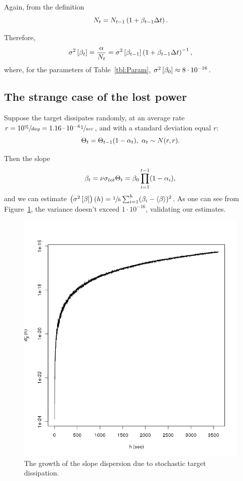 \documentclass{article}
\begin{document}
Again, from the definition
\[
	N_t = N_{t-1}\bkt{1 + \slp[t-1]\Delta t}.
\]

Therefore, 
\begin{equation}
\v{\slp[t]} = \frac{\alpha}{N_t} = \v{\slp[t-1]}\bkt{1 + \slp[t-1]\Delta t}^{-1},
\end{equation}
where, for the parameters of Table~\ref{tbl:Param}, $\v{\slp[0]} \approx 8\cdot10^{-16}$.

\subsection{The strange case of the lost power}
Suppose the target dissipates randomly, at an average rate $r = 10\sfrac{\%}{day} = 1.16\cdot10^{-6}\sfrac{1}{sec}$, and with a standard deviation equal $r$:
\[
	\Thick[t] = \Thick[t-1](1-\alpha_t),~ \alpha_t\sim N(r,r).
\]

Then the slope
\[
	\slp[t] = \nu\CS[tot]\Thick[t] = \slp[0]\prod_{i=1}^{t-1}(1-\alpha_i),
\]	
and we can estimate $\bkt{\v{\slp}}(h) = \sfrac 1h \sum_{i=1}^{h}(\slp[i] - \avg{\slp})^2$. As one can see from Figure~\ref{fig:varB_TD}, the variance doesn't exceed $1\cdot10^{-16}$, validating our estimates.

\begin{figure}
\includegraphics[scale=1]{varB_DissipThick}
\caption{The growth of the slope dispersion due to stochastic target dissipation.\label{fig:varB_TD}}
\end{figure}
\end{document}

